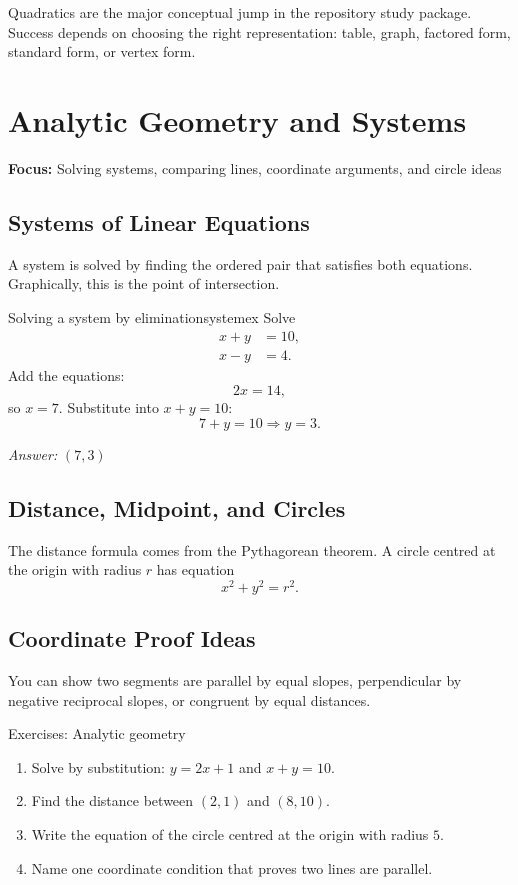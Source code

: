 \documentclass[11pt,oneside]{book}
\newcommand{\topicline}[1]{\medskip\noindent\textbf{Focus:} #1\par\medskip}
\newcommand{\answerline}{\par\smallskip\noindent\textit{Answer: }}
\begin{document}
\begin{summarybox}
Quadratics are the major conceptual jump in the repository study package. Success depends on choosing the right representation: table, graph, factored form, standard form, or vertex form.
\end{summarybox}

\chapter{Analytic Geometry and Systems}
\topicline{Solving systems, comparing lines, coordinate arguments, and circle ideas}

\section{Systems of Linear Equations}
A system is solved by finding the ordered pair that satisfies both equations. Graphically, this is the point of intersection.

\begin{example}{Solving a system by elimination}{systemex}
Solve
\[
\begin{aligned}
x+y&=10,\\
x-y&=4.
\end{aligned}
\]
\tcblower
Add the equations:
\[
2x=14,
\]
so $x=7$. Substitute into $x+y=10$:
\[
7+y=10 \Rightarrow y=3.
\]
\answerline $(7,3)$
\end{example}

\section{Distance, Midpoint, and Circles}
The distance formula comes from the Pythagorean theorem. A circle centred at the origin with radius $r$ has equation
\[
x^2+y^2=r^2.
\]

\section{Coordinate Proof Ideas}
You can show two segments are parallel by equal slopes, perpendicular by negative reciprocal slopes, or congruent by equal distances.

\begin{exercisebox}{Exercises: Analytic geometry}
\begin{enumerate}
  \item Solve by substitution: $y=2x+1$ and $x+y=10$.
  \item Find the distance between $(2,1)$ and $(8,10)$.
  \item Write the equation of the circle centred at the origin with radius $5$.
  \item Name one coordinate condition that proves two lines are parallel.
\end{enumerate}
\end{exercisebox}
\end{document}
